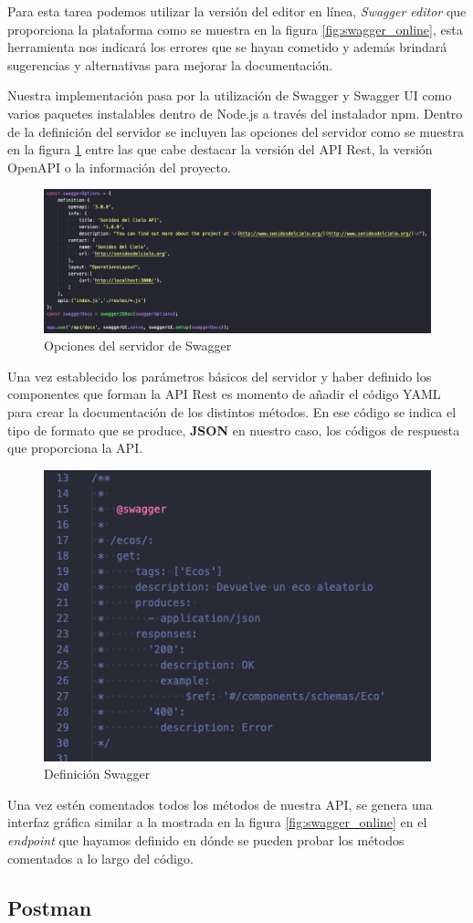 Para esta tarea podemos utilizar la versión del editor en línea, \textit{Swagger editor} que proporciona la plataforma como se muestra en la figura \ref{fig:swagger_online}, esta herramienta nos indicará los errores que se hayan cometido y además brindará sugerencias y alternativas para mejorar la documentación.

Nuestra implementación pasa por la utilización de Swagger y Swagger UI como varios paquetes instalables dentro de Node.js a través del instalador npm. Dentro de la definición del servidor se incluyen las opciones del servidor como se muestra en la figura \ref{fig:swagger_options} entre las que cabe destacar la versión del API Rest, la versión OpenAPI o la información del proyecto.

\begin{figure}[H]
    \centering
    \includegraphics[width=\textwidth]{include/capturas/SwaggerOptions.png}
    \caption{Opciones del servidor de Swagger}
    \label{fig:swagger_options}
\end{figure}

Una vez establecido los parámetros básicos del servidor y haber definido los componentes que forman la API Rest es momento de añadir el código YAML para crear la documentación de los distintos métodos. En ese código se indica el tipo de formato que se produce, \textbf{JSON} en nuestro caso, los códigos de respuesta que proporciona la API.

\begin{figure}[h]
    \centering
    \includegraphics[scale=0.7]{include/capturas/SwaggerYAML.png}
    \caption{Definición Swagger}
    \label{fig:swagger_definition}
\end{figure}

Una vez estén comentados todos los métodos de nuestra API, se genera una interfaz gráfica similar a la mostrada en la figura \ref{fig:swagger_online} en el \textit{endpoint} que hayamos definido en dónde se pueden probar los métodos comentados a lo largo del código.

\subsection{Postman}
